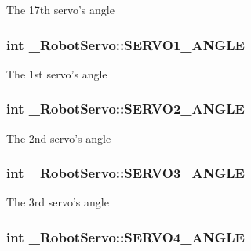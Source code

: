 The 17th servo's angle \hypertarget{struct__RobotServo_a1f1a8a3bbe5ead1dd6d601759a5ca98f}{
\subsubsection[{S\-E\-R\-V\-O1\-\_\-\-A\-N\-G\-L\-E}]{\setlength{\rightskip}{0pt plus 5cm}int \-\_\-\-Robot\-Servo\-::\-S\-E\-R\-V\-O1\-\_\-\-A\-N\-G\-L\-E}}\label{struct__RobotServo_a1f1a8a3bbe5ead1dd6d601759a5ca98f}
The 1st servo's angle \hypertarget{struct__RobotServo_afb1c3bb48d9ea043220aea87d53727b0}{
\subsubsection[{S\-E\-R\-V\-O2\-\_\-\-A\-N\-G\-L\-E}]{\setlength{\rightskip}{0pt plus 5cm}int \-\_\-\-Robot\-Servo\-::\-S\-E\-R\-V\-O2\-\_\-\-A\-N\-G\-L\-E}}\label{struct__RobotServo_afb1c3bb48d9ea043220aea87d53727b0}
The 2nd servo's angle \hypertarget{struct__RobotServo_ab11e8be260c447c377f2b00c1036d1a3}{
\subsubsection[{S\-E\-R\-V\-O3\-\_\-\-A\-N\-G\-L\-E}]{\setlength{\rightskip}{0pt plus 5cm}int \-\_\-\-Robot\-Servo\-::\-S\-E\-R\-V\-O3\-\_\-\-A\-N\-G\-L\-E}}\label{struct__RobotServo_ab11e8be260c447c377f2b00c1036d1a3}
The 3rd servo's angle \hypertarget{struct__RobotServo_a2812900c05863c2212a91adb1dcf8b2b}{
\subsubsection[{S\-E\-R\-V\-O4\-\_\-\-A\-N\-G\-L\-E}]{\setlength{\rightskip}{0pt plus 5cm}int \-\_\-\-Robot\-Servo\-::\-S\-E\-R\-V\-O4\-\_\-\-A\-N\-G\-L\-E}}\label{struct__RobotServo_a2812900c05863c2212a91adb1dcf8b2b}
